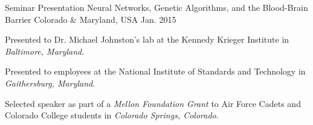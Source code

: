 

\begin{cventries}

  \cventry
    {Seminar Presentation} %
    {Neural Networks, Genetic Algorithms, and the Blood-Brain Barrier} %
    {Colorado \& Maryland, USA} %
    {Jan. 2015} %
    {
      \begin{cvitems} %
      \item {Presented to Dr. Michael Johnston's lab at the Kennedy Krieger Institute in \textit{Baltimore, Maryland}.}
      \item {Presented to employees at the National Institute of Standards and Technology in \textit{Gaithersburg, Maryland}.}
      \item {Selected speaker as part of a \textit{Mellon Foundation Grant} to Air Force Cadets and Colorado College students in \textit{Colorado Springs, Colorado}.}
      \end{cvitems}
    }

\end{cventries}
